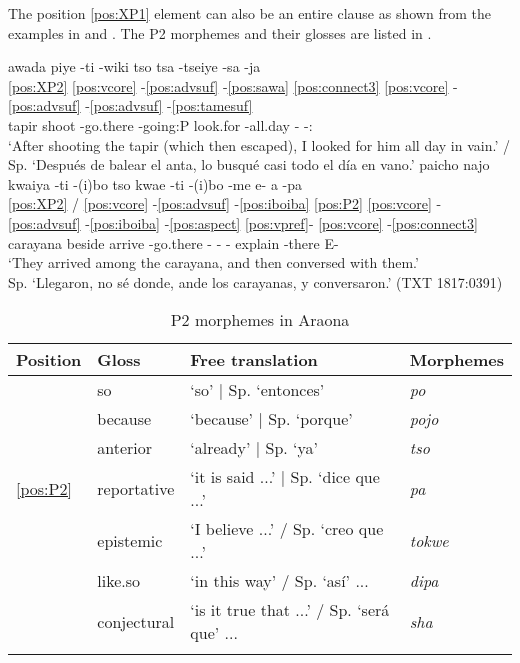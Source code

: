 \documentclass[output=paper,hidelinks]{langscibook}
\begin{document}
The position \ref{pos:XP1} element can also be an entire clause as shown from the examples in  and .
The P2 morphemes and their glosses are listed in .

\ea 
 \ea\label{ex:piyetiwikitso}
    \glll awada piye -ti -wiki tso tsa -tseiye -sa -ja \\
	\ref{pos:XP2} \ref{pos:vcore} -\ref{pos:advsuf} -\ref{pos:sawa} \ref{pos:connect3} \ref{pos:vcore} -\ref{pos:advsuf} -\ref{pos:advsuf} -\ref{pos:tamesuf} \\
	tapir shoot -go.there -going:P \Prior{} look.for -all.day -\Frust{} -\Recp{}:\Pst{} \\
	\glt `After shooting the tapir (which then escaped), I looked for him all day in vain.' / Sp. `Después de balear el anta, lo busqué casi todo el día en vano.'
 \hfill \citep[52]{pitman:1980:araonasketch}
 \ex \label{ex:kwaiyatibotso}
    \glll paicho najo kwaiya -ti -(i)bo tso kwae -ti -(i)bo -me e- a -pa \\
	\ref{pos:XP2} / \ref{pos:vcore} -\ref{pos:advsuf} -\ref{pos:iboiba} \ref{pos:P2} \ref{pos:vcore} -\ref{pos:advsuf} -\ref{pos:iboiba} -\ref{pos:aspect} \ref{pos:vpref}- \ref{pos:vcore} -\ref{pos:connect3}    	     \\
	carayana beside arrive -go.there -\Relev{} \Prior{} -\Intrc{} -\Final{} explain -there E- \Aux{} \Rep{} \\
	\glt `They arrived among the carayana, and then conversed with them.' \\ Sp. `Llegaron, no sé donde, ande los carayanas, y conversaron.'
 \hfill (TXT 1817:0391)
  \z
\z


\begin{table}
\caption{P2 morphemes in Araona}
\label{tab:P2}
\begin{tabular}{llll}
\lsptoprule
Position & Gloss & Free translation & Morphemes \\ \midrule
 & so & `so' | Sp. `entonces' & \textit{po} \\
 & because & `because' | Sp. `porque' & \textit{pojo} \\
 & anterior & `already' | Sp. `ya' & \textit{tso} \\
\ref{pos:P2} & reportative & `it is said ...' | Sp. `dice que ...' & \textit{pa} \\
 & epistemic & `I believe ...' / Sp. `creo que ...' & \textit{tokwe} \\
 & like.so & `in this way' / Sp. `así' ... & \textit{dipa} \\
 & conjectural & `is it true that ...' / Sp. `será que' ... & \textit{sha} \\
 \lspbottomrule
\end{tabular}
\end{table}
\end{document}
